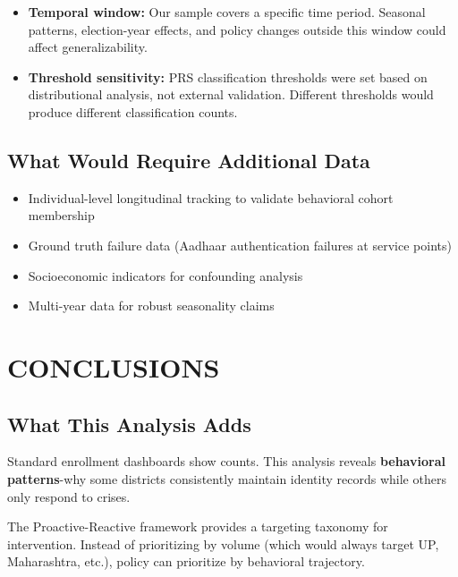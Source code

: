 \documentclass[11pt, a4paper]{article}
\begin{document}
\begin{itemize}
\item \textbf{Temporal window:} Our sample covers a specific time period. Seasonal patterns, election-year effects, and policy changes outside this window could affect generalizability.
\end{itemize}

\begin{itemize}
\item \textbf{Threshold sensitivity:} PRS classification thresholds were set based on distributional analysis, not external validation. Different thresholds would produce different classification counts.
\end{itemize}

\subsection{What Would Require Additional Data}

\begin{itemize}
\item Individual-level longitudinal tracking to validate behavioral cohort membership

\item Ground truth failure data (Aadhaar authentication failures at service points)

\item Socioeconomic indicators for confounding analysis

\item Multi-year data for robust seasonality claims
\end{itemize}



\section{CONCLUSIONS}

\subsection{What This Analysis Adds}

Standard enrollment dashboards show counts. This analysis reveals \textbf{behavioral patterns}-why some districts consistently maintain identity records while others only respond to crises.


The Proactive-Reactive framework provides a targeting taxonomy for intervention. Instead of prioritizing by volume (which would always target UP, Maharashtra, etc.), policy can prioritize by behavioral trajectory.
\end{document}

